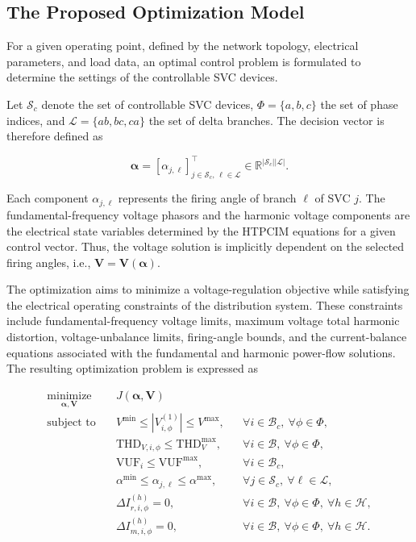 \documentclass[journal]{IEEEtran}
\begin{document}
\subsection{The Proposed Optimization Model}

For a given operating point, defined by the network topology, electrical
parameters, and load data, an optimal control problem is formulated to
determine the settings of the controllable SVC devices.

Let $\mathcal{S}_c$ denote the set of controllable SVC devices,
$\Phi=\{a,b,c\}$ the set of phase indices, and
$\mathcal{L}=\{ab,bc,ca\}$ the set of delta branches. The decision
vector is therefore defined as

\begin{equation}
    \bm{\alpha}=
    \left[\alpha_{j,\ell}\right]_{j\in\mathcal{S}_c,\,\ell\in\mathcal{L}}^{\top}
    \in\mathbb{R}^{|\mathcal{S}_c||\mathcal{L}|}.
    \label{eq:decision_vector}
\end{equation}

Each component $\alpha_{j,\ell}$ represents the firing angle of branch
$\ell$ of SVC $j$. The fundamental-frequency voltage
phasors and the harmonic voltage components are the electrical state
variables determined by the HTPCIM equations for a given control vector.
Thus, the voltage solution is implicitly dependent on the selected
firing angles, i.e., $\bm{V}=\bm{V}(\bm{\alpha})$.

The optimization aims to minimize a voltage-regulation objective while
satisfying the electrical operating constraints of the distribution
system. These constraints include fundamental-frequency voltage limits,
maximum voltage total harmonic distortion, voltage-unbalance limits,
firing-angle bounds, and the current-balance equations associated with
the fundamental and harmonic power-flow solutions. The resulting
optimization problem is expressed as

\begin{subequations}
\label{eq:optimization_problem}
\begin{align}
    \underset{\bm{\alpha},\bm{V}}{\operatorname{minimize}}\quad
    &J(\bm{\alpha},\bm{V})\\
    \text{subject to}\quad
    &V^{\min}\leq |V_{i,\phi}^{(1)}|\leq V^{\max},
    &&\forall i\in\mathcal{B}_c,\ \forall\phi\in\Phi,\\
    &\mathrm{THD}_{V,i,\phi}\leq\mathrm{THD}_{V}^{\max},
    &&\forall i\in\mathcal{B},\ \forall\phi\in\Phi,\\
    &\mathrm{VUF}_{i}\leq\mathrm{VUF}^{\max},
    &&\forall i\in\mathcal{B}_c,\\
    &\alpha^{\min}\leq\alpha_{j,\ell}\leq\alpha^{\max},
    &&\forall j\in\mathcal{S}_c,\ \forall\ell\in\mathcal{L},\\
    &\Delta I_{r,i,\phi}^{(h)}=0,
    &&\forall i\in\mathcal{B},\ \forall\phi\in\Phi,\ \forall h\in\mathcal{H},\\
    &\Delta I_{m,i,\phi}^{(h)}=0,
    &&\forall i\in\mathcal{B},\ \forall\phi\in\Phi,\ \forall h\in\mathcal{H}.
\end{align}
\end{subequations}
\end{document}
